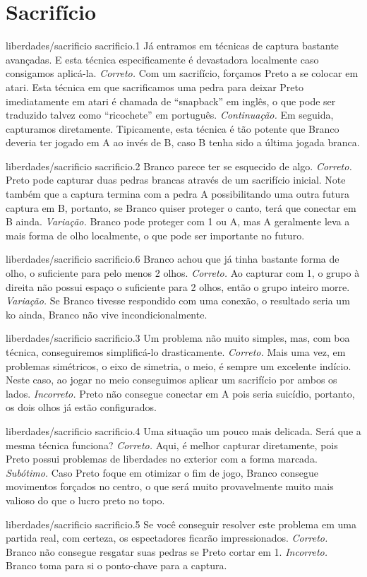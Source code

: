\chapter{Sacrifício}

\emptypage

\problemAnswerDiagram
  {liberdades/sacrificio}
  {sacrificio.1}
  {Já entramos em técnicas de captura bastante avançadas. E esta técnica especificamente é devastadora localmente caso consigamos aplicá-la.}
  {\emph{Correto.} Com um sacrifício, forçamos Preto a se colocar em atari. Esta técnica em que sacrificamos uma pedra para deixar Preto imediatamente em atari é chamada de ``snapback'' em inglês, o que pode ser traduzido talvez como ``ricochete'' em português.}
  {\emph{Continuação.} Em seguida, capturamos diretamente. Tipicamente, esta técnica é tão potente que Branco deveria ter jogado em A ao invés de B, caso B tenha sido a última jogada branca.}

\problemAnswerDiagram
  {liberdades/sacrificio}
  {sacrificio.2}
  {Branco parece ter se esquecido de algo.}
  {\emph{Correto.} Preto pode capturar duas pedras brancas através de um sacrifício inicial. Note também que a captura termina com a pedra A possibilitando uma outra futura captura em B, portanto, se Branco quiser proteger o canto, terá que conectar em B ainda.}
  {\emph{Variação.} Branco pode proteger com 1 ou A, mas A geralmente leva a mais forma de olho localmente, o que pode ser importante no futuro.}

\problemAnswerDiagram
  {liberdades/sacrificio}
  {sacrificio.6}
  {Branco achou que já tinha bastante forma de olho, o suficiente para pelo menos 2 olhos.}
  {\emph{Correto.} Ao capturar com 1, o grupo à direita não possui espaço o suficiente para 2 olhos, então o grupo inteiro morre.}
  {\emph{Variação.} Se Branco tivesse respondido com uma conexão, o resultado seria um ko ainda, Branco não vive incondicionalmente.}

\problemAnswerDiagram
  {liberdades/sacrificio}
  {sacrificio.3}
  {Um problema não muito simples, mas, com boa técnica, conseguiremos simplificá-lo drasticamente.}
  {\emph{Correto.} Mais uma vez, em problemas simétricos, o eixo de simetria, o meio, é sempre um excelente indício. Neste caso, ao jogar no meio conseguimos aplicar um sacrifício por ambos os lados.}
  {\emph{Incorreto.} Preto não consegue conectar em A pois seria suicídio, portanto, os dois olhos já estão configurados.}

\problemAnswerDiagram
  {liberdades/sacrificio}
  {sacrificio.4}
  {Uma situação um pouco mais delicada. Será que a mesma técnica funciona?}
  {\emph{Correto.} Aqui, é melhor capturar diretamente, pois Preto possui problemas de liberdades no exterior com a forma marcada.}
  {\emph{Subótimo.} Caso Preto foque em otimizar o fim de jogo, Branco consegue movimentos forçados no centro, o que será muito provavelmente muito mais valioso do que o lucro preto no topo.}

\problemAnswerDiagram
  {liberdades/sacrificio}
  {sacrificio.5}
  {Se você conseguir resolver este problema em uma partida real, com certeza, os espectadores ficarão impressionados.}
  {\emph{Correto.} Branco não consegue resgatar suas pedras se Preto cortar em 1.}
  {\emph{Incorreto.} Branco toma para si o ponto-chave para a captura.}